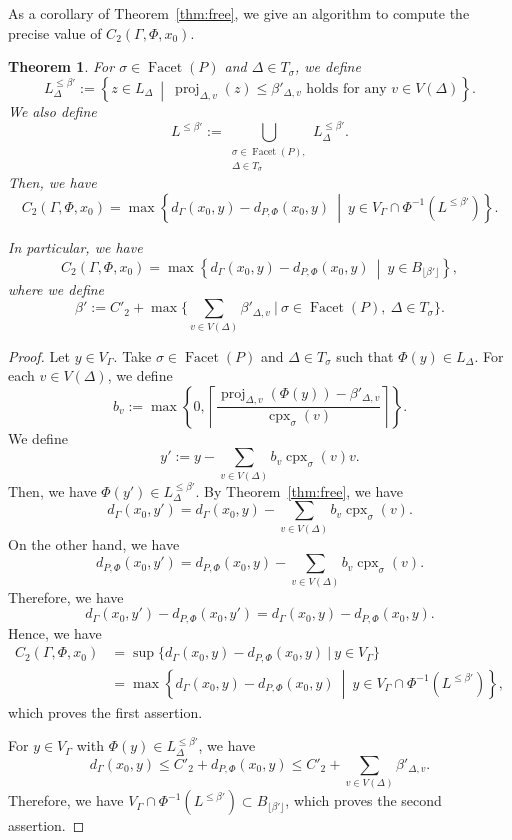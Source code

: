 \documentclass[11pt]{article}
\newtheorem{thm}[theo]{Theorem}
\theoremstyle{definition}
\numberwithin{equation}{section}
\begin{document}
As a corollary of Theorem~\ref{thm:free}, we give an algorithm to compute the precise value of $C_{2}(\Gamma, \Phi, x_0)$. 

\begin{thm}\label{thm:C2}
For $\sigma \in \operatorname{Facet}(P)$ and $\Delta \in T_{\sigma}$, 
we define 
\[
L_{\Delta} ^{\le \beta'} 
:= \left \{ z \in L_{\Delta} \ \middle | \ \text{$\operatorname{proj}_{\Delta, v}(z) \le \beta' _{\Delta, v}$ holds for any $v \in V(\Delta)$} \right \}. 
\]
We also define 
\[
L ^{\le \beta'} := 
\bigcup _{\substack{\sigma \in \operatorname{Facet}(P),\\ \Delta \in T_{\sigma}}}
L_{\Delta} ^{\le \beta'}.  
\]
Then, we have 
\[
C_{2}(\Gamma, \Phi, x_0) = 
\max \left \{ d_{\Gamma}(x_0, y) - d_{P, \Phi}(x_0, y) \ \middle | \ 
y \in V_{\Gamma} \cap \Phi ^{-1} \left( L ^{\le \beta'} \right) \right \}. 
\]

In particular, we have 
\[
C_{2}(\Gamma, \Phi, x_0) = \max \left \{ d_{\Gamma}(x_0, y) - d_{P, \Phi}(x_0, y) \ \middle | \ 
y \in B_{\lfloor \beta ' \rfloor} \right \}, 
\]
where we define 
\[
\beta ' := C'_2 + \max 
\Biggl \{ \sum _{v \in V(\Delta)} \beta' _{\Delta, v} \ \Bigg| \ \sigma \in \operatorname{Facet}(P), \ \Delta \in T_{\sigma} \Biggr \}. 
\]
\end{thm}
\begin{proof}
Let $y \in V_{\Gamma}$. 
Take $\sigma \in \operatorname{Facet}(P)$ and $\Delta \in T_{\sigma}$ such that $\Phi(y) \in L_{\Delta}$.
For each $v \in V(\Delta)$, we define 
\[
b_v := \max 
\left\{ 0, 
\left \lceil  \frac{\operatorname{proj}_{\Delta, v}(\Phi(y)) - \beta' _{\Delta, v}}{\operatorname{cpx}_{\sigma}(v)} 
\right \rceil \right\}. 
\]
We define
\[
y' := y - \sum _{v \in V(\Delta)} b_v \operatorname{cpx}_{\sigma}(v) v. 
\]
Then, we have $\Phi(y') \in L _{\Delta} ^{\le \beta'}$. By Theorem~\ref{thm:free}, we have 
\[
d_{\Gamma}(x_0, y') = d_{\Gamma}(x_0, y) - \sum _{v \in V(\Delta)} b_v \operatorname{cpx}_{\sigma}(v). 
\]
On the other hand, we have 
\[
d_{P, \Phi}(x_0, y') = d_{P, \Phi}(x_0, y) - \sum _{v \in V(\Delta)} b_v \operatorname{cpx}_{\sigma}(v). 
\]
Therefore, we have 
\[
d_{\Gamma}(x_0, y') - d_{P, \Phi}(x_0, y') = d_{\Gamma}(x_0, y) - d_{P, \Phi}(x_0, y). 
\]
Hence, we have 
\begin{align*}
C_{2}(\Gamma, \Phi, x_0) 
&= \sup \bigl \{ d_{\Gamma}(x_0, y) - d_{P, \Phi}(x_0, y) \ \big | \ y \in V_{\Gamma} \bigr\} \\
&= \max \left \{ d_{\Gamma}(x_0, y) - d_{P, \Phi}(x_0, y) \ \middle | \ 
y \in V_{\Gamma} \cap \Phi ^{-1} \left( L ^{\le \beta'} \right) \right \}, 
\end{align*}
which proves the first assertion. 

For $y \in V_{\Gamma}$ with $\Phi(y) \in L_{\Delta} ^{\le \beta'}$, we have 
\[
d_{\Gamma}(x_0, y) \le C'_2 + d_{P, \Phi}(x_0, y) \le C'_2 +  \sum _{v \in V(\Delta)} \beta' _{\Delta, v}. 
\]
Therefore, we have $V_{\Gamma} \cap \Phi ^{-1} \left( L ^{\le \beta'} \right) \subset B_{\lfloor \beta ' \rfloor}$, 
which proves the second assertion. 
\end{proof}
\end{document}
